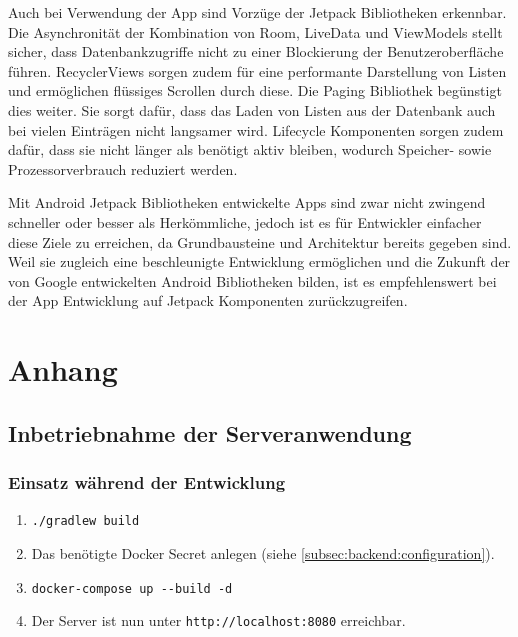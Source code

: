 \documentclass[a4paper, 11pt]{article}
\begin{document}
Auch bei Verwendung der App sind Vorzüge der Jetpack Bibliotheken erkennbar.
Die Asynchronität der Kombination von Room, LiveData und ViewModels stellt sicher, dass Datenbankzugriffe nicht zu einer Blockierung der Benutzeroberfläche führen.
RecyclerViews sorgen zudem für eine performante Darstellung von Listen und ermöglichen flüssiges Scrollen durch diese.
Die Paging Bibliothek begünstigt dies weiter.
Sie sorgt dafür, dass das Laden von Listen aus der Datenbank auch bei vielen Einträgen nicht langsamer wird.
Lifecycle Komponenten sorgen zudem dafür, dass sie nicht länger als benötigt aktiv bleiben, wodurch Speicher- sowie Prozessorverbrauch reduziert werden.

Mit Android Jetpack Bibliotheken entwickelte Apps sind zwar nicht zwingend schneller oder besser als Herkömmliche, jedoch ist es für Entwickler einfacher diese Ziele zu erreichen, da Grundbausteine und Architektur bereits gegeben sind.
Weil sie zugleich eine beschleunigte Entwicklung ermöglichen und die Zukunft der von Google entwickelten Android Bibliotheken bilden, ist es empfehlenswert bei der App Entwicklung auf Jetpack Komponenten zurückzugreifen.

\newpage
\begingroup
\raggedright
\printbibliography[title={Referenzen}, keyword=citations]
\nocite{*}
\newrefcontext[sorting=nty]
\printbibliography[title={Dokumentationen}, keyword=sources, env=sources]
\endgroup

\newpage
\section*{Anhang}
\label{sec:attachments}

\subsection*{Inbetriebnahme der Serveranwendung}
\label{subsec:attachments:instructions}

\subsubsection*{Einsatz während der Entwicklung}
\label{subsubsec:attachments:instructions:development}
\begin{enumerate}
	\item \verb|./gradlew build|
	\item Das benötigte Docker Secret anlegen (siehe \autoref{subsec:backend:configuration}).
	\item \verb|docker-compose up --build -d|
	\item Der Server ist nun unter \verb|http://localhost:8080| erreichbar.
\end{enumerate}
\end{document}
